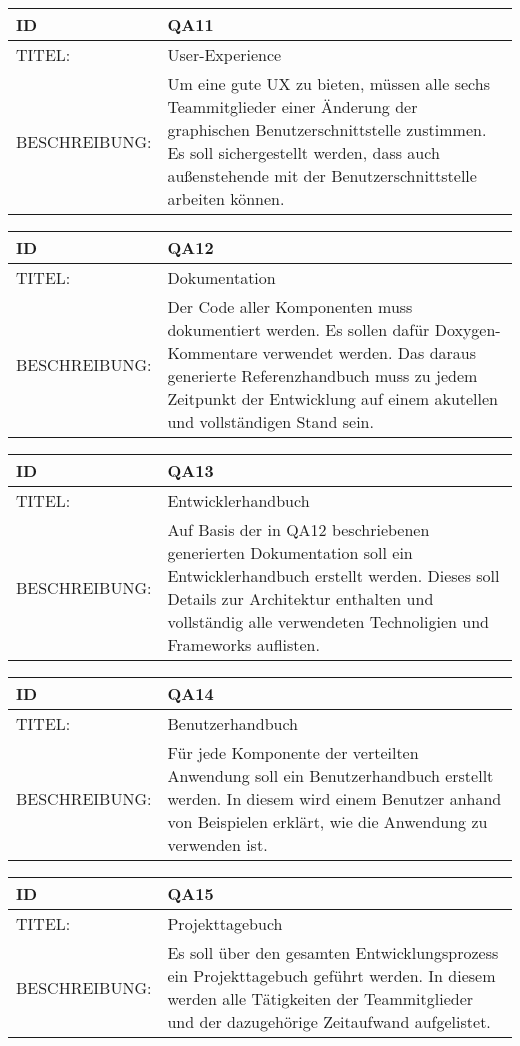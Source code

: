 \begin{tabularx}{16cm}{l|X}
	 \textbf{ID} & \textbf{QA11} \\
	 \hline
		TITEL: & User-Experience\\ 
	 \hline 
	 BESCHREIBUNG: & Um eine gute UX zu bieten, müssen alle sechs Teammitglieder einer Änderung der graphischen Benutzerschnittstelle zustimmen. Es soll sichergestellt werden, dass auch außenstehende mit der Benutzerschnittstelle arbeiten können. 
\end{tabularx} 


\begin{tabularx}{16cm}{l|X}
	 \textbf{ID} & \textbf{QA12} \\
	 \hline
		TITEL: & Dokumentation\\ 
	 \hline 
	 BESCHREIBUNG: & Der Code aller Komponenten muss dokumentiert werden. Es sollen dafür Doxygen-Kommentare verwendet werden. Das daraus generierte Referenzhandbuch muss zu jedem Zeitpunkt der Entwicklung auf einem akutellen und vollständigen Stand sein.  
\end{tabularx} 


\begin{tabularx}{16cm}{l|X}
	 \textbf{ID} & \textbf{QA13} \\
	 \hline
		TITEL: & Entwicklerhandbuch\\ 
	 \hline 
	 BESCHREIBUNG: & Auf Basis der in QA12 beschriebenen generierten Dokumentation soll ein Entwicklerhandbuch erstellt werden. Dieses soll Details zur Architektur enthalten und vollständig alle verwendeten Technoligien und Frameworks auflisten.
\end{tabularx} 


\begin{tabularx}{16cm}{l|X}
	 \textbf{ID} & \textbf{QA14} \\
	 \hline
		TITEL: & Benutzerhandbuch\\ 
	 \hline 
	 BESCHREIBUNG: & Für jede Komponente der verteilten Anwendung soll ein Benutzerhandbuch erstellt werden. In diesem wird einem Benutzer anhand von Beispielen erklärt, wie die Anwendung zu verwenden ist. 
\end{tabularx} 


\begin{tabularx}{16cm}{l|X}
	 \textbf{ID} & \textbf{QA15} \\
	 \hline
		TITEL: & Projekttagebuch\\ 
	 \hline 
	 BESCHREIBUNG: & Es soll über den gesamten Entwicklungsprozess ein Projekttagebuch geführt werden. In diesem werden alle Tätigkeiten der Teammitglieder und der dazugehörige Zeitaufwand aufgelistet. 
\end{tabularx} 
